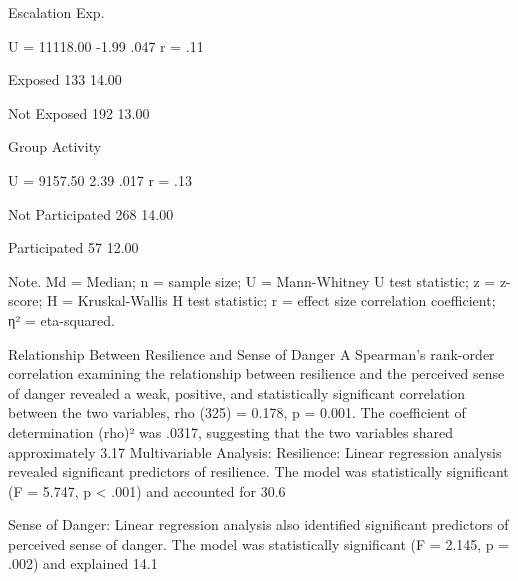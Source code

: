 Escalation Exp.


U = 11118.00
-1.99
.047
r = .11

   Exposed
133
14.00





   Not Exposed
192
13.00





Group Activity


U = 9157.50
2.39
.017
r = .13

   Not Participated
268
14.00





   Participated
57
12.00





Note. Md = Median; n = sample size; U = Mann-Whitney U test statistic; z = z-score; H = Kruskal-Wallis H test statistic; r = effect size correlation coefficient; η² = eta-squared.

Relationship Between Resilience and Sense of Danger
A Spearman's rank-order correlation  examining the relationship between resilience and the perceived sense of danger revealed a weak, positive, and statistically significant correlation between the two variables, rho (325) = 0.178, p = 0.001. The coefficient of determination (rho)² was .0317, suggesting that the two variables shared approximately 3.17%
Multivariable Analysis:
Resilience:
Linear regression analysis revealed significant predictors of resilience. The model was statistically significant (F = 5.747, p < .001) and accounted for 30.6%

 Sense of Danger:
Linear regression analysis also identified significant predictors of perceived sense of danger. The model was statistically significant (F = 2.145, p = .002) and explained 14.1%

